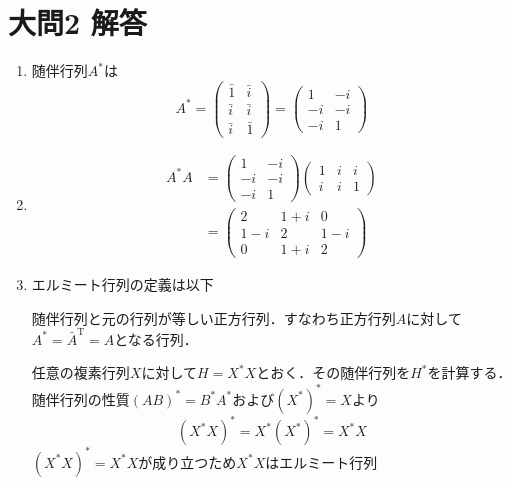 \documentclass[dvipdfmx]{jsreport}
\begin{document}
\section{大問2 解答}
\begin{souanswer} %
\begin{enumerate}
	\item 随伴行列$A^{*}$は
\begin{equation*}
	A^{*}= 
\begin{pmatrix}
	\bar{1}& \bar{i}\\
	\bar{i}& \bar{i}\\
	\bar{i}& \bar{1}
\end{pmatrix}
	=
\begin{pmatrix}
	1& -i\\
	-i& -i\\
	-i& 1
\end{pmatrix}
\end{equation*}
	\item
\begin{align*}
	A^{*}A
	&=
\begin{pmatrix}
	1& -i\\
	-i& -i\\
	-i& 1
\end{pmatrix}
\begin{pmatrix}
	1& i& i\\
	i& i& 1
\end{pmatrix}\\
	&= 
\begin{pmatrix}
	2& 1+ i& 0\\
	1- i& 2& 1- i\\
	0& 1+ i& 2
\end{pmatrix}
\end{align*}
	\item エルミート行列の定義は以下
\begin{tcolorbox}
	随伴行列と元の行列が等しい正方行列．すなわち正方行列$A$に対して$A^*= \bar{A}^\mathrm{T}= A$となる行列．
\end{tcolorbox}
	任意の複素行列$X$に対して$H= X^*X$とおく．その随伴行列を$H^*$を計算する．随伴行列の性質$(AB)^*= B^*A^*$および$(X^*)^*= X$より
\begin{equation*}
	(X^*X)^*= X^*(X^*)^*= X^*X
\end{equation*}
	$(X^*X)^*= X^*X$が成り立つため$X^*X$はエルミート行列
\end{enumerate}
\end{souanswer}
\end{document}
